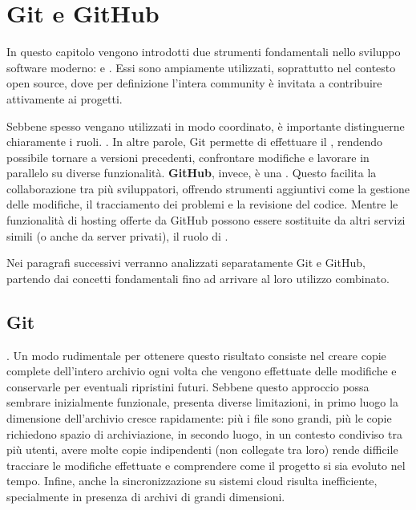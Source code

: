 \chapter{Git e GitHub}
\label{chapter:git-e-github}
In questo capitolo vengono introdotti due strumenti fondamentali nello sviluppo software moderno:  e . Essi sono ampiamente utilizzati, soprattutto nel contesto open source, dove per definizione l'intera community è invitata a contribuire attivamente ai progetti.

Sebbene spesso vengano utilizzati in modo coordinato, è importante distinguerne chiaramente i ruoli. . In altre parole, Git permette di effettuare il , rendendo possibile tornare a versioni precedenti, confrontare modifiche e lavorare in parallelo su diverse funzionalità. \textbf{GitHub}, invece, è una . Questo facilita la collaborazione tra più sviluppatori, offrendo strumenti aggiuntivi come la gestione delle modifiche, il tracciamento dei problemi e la revisione del codice. Mentre le funzionalità di hosting offerte da GitHub possono essere sostituite da altri servizi simili (o anche da server privati), il ruolo di .

Nei paragrafi successivi verranno analizzati separatamente Git e GitHub, partendo dai concetti fondamentali fino ad arrivare al loro utilizzo combinato.


\section{Git}
\label{sec:git}
. Un modo rudimentale per ottenere questo risultato consiste nel creare copie complete dell'intero archivio ogni volta che vengono effettuate delle modifiche e conservarle per eventuali ripristini futuri. 
Sebbene questo approccio possa sembrare inizialmente funzionale, presenta diverse limitazioni, in primo luogo la dimensione dell'archivio cresce rapidamente: più i file sono grandi, più le copie richiedono spazio di archiviazione, in secondo luogo, in un contesto condiviso tra più utenti, avere molte copie indipendenti (non collegate tra loro) rende difficile tracciare le modifiche effettuate e comprendere come il progetto si sia evoluto nel tempo. Infine, anche la sincronizzazione su sistemi cloud risulta inefficiente, specialmente in presenza di archivi di grandi dimensioni.

